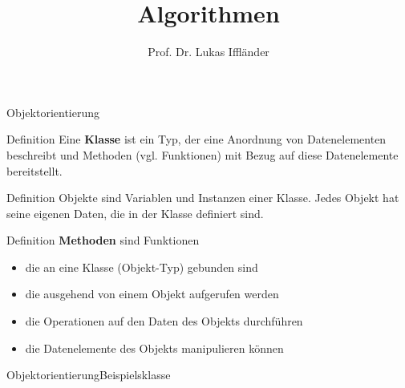 \documentclass[xelatex,aspectratio=169]{beamer}
\title{Algorithmen}
\author{Prof. Dr. Lukas Iffländer}
\institute{HTW Dresden}
\date{}
\begin{document}
\begin{frame}{Objektorientierung}
    \begin{block}{Definition}
        Eine \textbf{Klasse} ist ein Typ, der eine Anordnung von Datenelementen beschreibt und Methoden (vgl. Funktionen) mit Bezug auf diese Datenelemente bereitstellt.
    \end{block}
    \begin{block}{Definition}
        Objekte sind Variablen und Instanzen einer Klasse. Jedes Objekt hat seine eigenen Daten, die in der Klasse definiert sind.
    \end{block}
    \begin{block}{Definition}
        \textbf{Methoden} sind Funktionen
        \begin{itemize}
            \item die an eine Klasse (Objekt-Typ) gebunden sind
            \item die ausgehend von einem Objekt aufgerufen werden
            \item die Operationen auf den Daten des Objekts durchführen
            \item die Datenelemente des Objekts manipulieren können
        \end{itemize}
    \end{block}

\end{frame}

\begin{frame}{Objektorientierung}{Beispielsklasse}
    \smaller
    \inputminted[escapeinside=$$]{python}{src/class_bike_annotated.py}


\end{frame}
\end{document}
